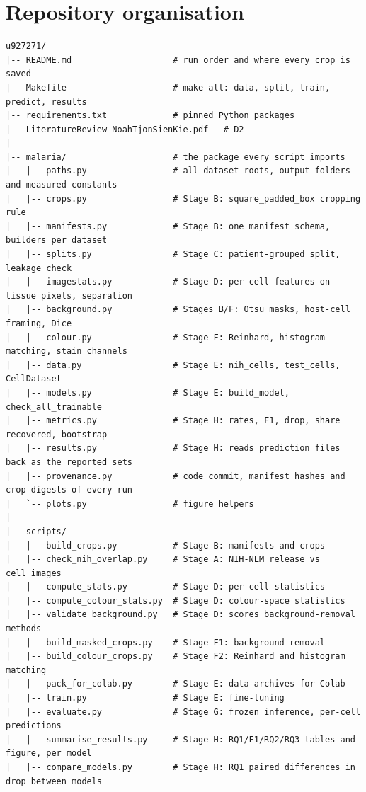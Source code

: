 \documentclass[11pt,a4paper]{article}
\begin{document}
\clearpage
\section{Repository organisation}

\begin{Verbatim}[fontsize=\fontsize{6.5}{8}\selectfont,frame=none]
u927271/
|-- README.md                    # run order and where every crop is saved
|-- Makefile                     # make all: data, split, train, predict, results
|-- requirements.txt             # pinned Python packages
|-- LiteratureReview_NoahTjonSienKie.pdf   # D2
|
|-- malaria/                     # the package every script imports
|   |-- paths.py                 # all dataset roots, output folders and measured constants
|   |-- crops.py                 # Stage B: square_padded_box cropping rule
|   |-- manifests.py             # Stage B: one manifest schema, builders per dataset
|   |-- splits.py                # Stage C: patient-grouped split, leakage check
|   |-- imagestats.py            # Stage D: per-cell features on tissue pixels, separation
|   |-- background.py            # Stages B/F: Otsu masks, host-cell framing, Dice
|   |-- colour.py                # Stage F: Reinhard, histogram matching, stain channels
|   |-- data.py                  # Stage E: nih_cells, test_cells, CellDataset
|   |-- models.py                # Stage E: build_model, check_all_trainable
|   |-- metrics.py               # Stage H: rates, F1, drop, share recovered, bootstrap
|   |-- results.py               # Stage H: reads prediction files back as the reported sets
|   |-- provenance.py            # code commit, manifest hashes and crop digests of every run
|   `-- plots.py                 # figure helpers
|
|-- scripts/
|   |-- build_crops.py           # Stage B: manifests and crops
|   |-- check_nih_overlap.py     # Stage A: NIH-NLM release vs cell_images
|   |-- compute_stats.py         # Stage D: per-cell statistics
|   |-- compute_colour_stats.py  # Stage D: colour-space statistics
|   |-- validate_background.py   # Stage D: scores background-removal methods
|   |-- build_masked_crops.py    # Stage F1: background removal
|   |-- build_colour_crops.py    # Stage F2: Reinhard and histogram matching
|   |-- pack_for_colab.py        # Stage E: data archives for Colab
|   |-- train.py                 # Stage E: fine-tuning
|   |-- evaluate.py              # Stage G: frozen inference, per-cell predictions
|   |-- summarise_results.py     # Stage H: RQ1/F1/RQ2/RQ3 tables and figure, per model
|   |-- compare_models.py        # Stage H: RQ1 paired differences in drop between models

\end{Verbatim}
\end{document}
